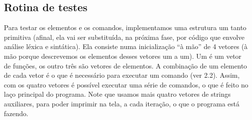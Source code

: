 \documentclass{article}
\begin{document}
\subsection{Rotina de testes}

Para testar os elementos e os comandos, implementamos uma estrutura um tanto
primitiva (afinal, ela vai ser substituída, na próxima fase, por código que
envolve análise léxica e sintática). Ela consiste numa inicialização ``à mão''
de 4 vetores (à mão porque descrevemos os elementos desses vetores um a um). Um
é um vetor de funções, os outro três são vetores de elementos. A combinação de
um elemento de cada vetor é o que é necessário para executar um comando (ver
2.2). Assim, com os quatro vetores é possível executar uma série de
comandos, o que é feito no laço principal do programa. Note que usamos mais
quatro vetores de strings auxiliares, para poder imprimir na tela, a cada
iteração, o que o programa está fazendo.
\end{document}

